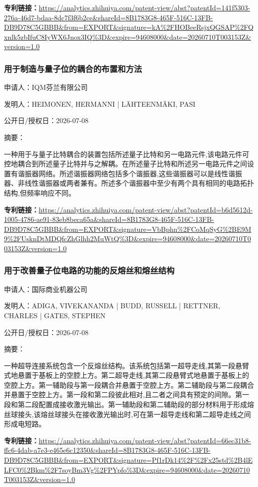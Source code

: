 \documentclass[12pt,a4paper]{ctexart}
\begin{document}
\noindent\textbf{专利链接：}\url{https://analytics.zhihuiya.com/patent-view/abst?patentId=141f5303-276a-46d7-bdaa-8dc7f3f6b2ce&shareId=8B1783G8-465F-516C-13FB-DB9D78C5GBBB&from=EXPORT&signature=kA%2FHOBeeRsjxQGSAP%2FQxnlk5zbIfuC8IyWX6Jnox3IQ%3D&expire=94608000&date=20260710T003153Z&version=1.0}

\subsubsection{ 用于制造与量子位的耦合的布置和方法 }

申请人：IQM芬兰有限公司

发明人：HEIMONEN, HERMANNI | LÄHTEENMÄKI, PASI

公开日/授权日：2026-07-08

摘要：

一种用于与量子比特耦合的装置包括所述量子比特和另一电路元件,该电路元件可控地耦合到所述量子比特并与之解耦。在所述量子比特和所述另一电路元件之间设置有谐振器网络。所述谐振器网络包括多个谐振器,这些谐振器可以是线性谐振器、非线性谐振器或两者兼有。所述多个谐振器中至少有两个具有相同的电路拓扑结构,但频率响应不同。

\noindent\textbf{专利链接：}\url{https://analytics.zhihuiya.com/patent-view/abst?patentId=b6d5612d-1005-4786-ae91-83eb8beca65a&shareId=8B1783G8-465F-516C-13FB-DB9D78C5GBBB&from=EXPORT&signature=VbBphn%2FCoMqSyG%2BE9M9%2FUsknDtMDQfcZhGlhh2MuWtQ%3D&expire=94608000&date=20260710T003153Z&version=1.0}

\subsubsection{ 用于改善量子位电路的功能的反熔丝和熔丝结构 }

申请人：国际商业机器公司

发明人：ADIGA, VIVEKANANDA | BUDD, RUSSELL | RETTNER, CHARLES | GATES, STEPHEN

公开日/授权日：2026-07-08

摘要：

一种超导连接系统包含一个反熔丝结构。该系统包括第一超导走线,其第一段悬臂式地悬置于基板上的空腔上方。第二超导走线,其第二段悬臂式地悬置于基板上的空腔上方。第一辅助段与第一段耦合并悬置于空腔上方。第二辅助段与第二段耦合并悬置于空腔上方。第一段和第二段彼此相对,且二者之间具有预定的间隙。第一段和第二段配置成接收激光输出。第一辅助段和第二辅助段的部分材料用于形成熔丝球接头,该熔丝球接头在接收激光输出时,可在第一超导走线和第二超导走线之间形成电短路。

\noindent\textbf{专利链接：}\url{https://analytics.zhihuiya.com/patent-view/abst?patentId=66ec31b8-ffc6-4dab-a7e3-e465e6c12350&shareId=8B1783G8-465F-516C-13FB-DB9D78C5GBBB&from=EXPORT&signature=Pf1rDk14%2F%2Fx25std%2B4lELFC0%2Bkm%2F7soyBm3Vg%2FPYpfo%3D&expire=94608000&date=20260710T003153Z&version=1.0}
\end{document}

